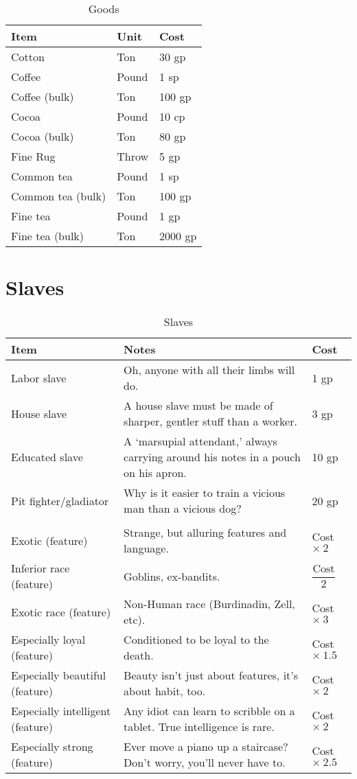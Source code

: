 \documentclass[oneside,11pt,english]{book}
\begin{document}
\begin{table}[hb]
  \centering
  \caption{Goods}
  \label{tab:Goods}
  \begin{tabu} spread 0pt {*{3}{X[-1]}}
    Item &Unit &Cost\\\toprule
    Cotton &Ton &30 gp\\
    Coffee &Pound &1 sp\\
    Coffee (bulk) &Ton &100 gp\\
    Cocoa &Pound &10 cp\\
    Cocoa (bulk) &Ton &80 gp\\
    Fine Rug &Throw &5 gp\\
    Common tea &Pound &1 sp\\
    Common tea (bulk) &Ton &100 gp\\
    Fine tea &Pound &1 gp\\
    Fine tea (bulk) &Ton &2000 gp\\
  \end{tabu}
\end{table}
\clearpage
\section{Slaves}
\begin{table}[hb]
  \centering
  \caption{Slaves}
  \label{tab:Slaves}
  \begin{tabu} spread 0pt {*{3}{X[-1]}}
    Item &Notes &Cost\\\toprule
    Labor slave &Oh, anyone with all their limbs will do. &1 gp\\
    House slave &A house slave must be made of sharper, gentler stuff than a worker. &3 gp\\
    Educated slave &A ‘marsupial attendant,’ always carrying around his notes in a pouch on his apron. &10 gp\\
    Pit fighter/gladiator &Why is it easier to train a vicious man than a vicious dog? &20 gp\\
    \\
    Exotic (feature) &Strange, but alluring features and language. &Cost $\times\ 2 $\\
    Inferior race (feature) &Goblins, ex-bandits. &$ \dfrac{\text{Cost}}{2} $\\
    Exotic race (feature) &Non-Human race (Burdinadin, Zell, etc). &Cost $ \times\ 3$\\
    Especially loyal (feature) &Conditioned to be loyal to the death. &Cost $ \times\ 1.5 $\\
    Especially beautiful (feature) &Beauty isn’t just about features, it’s about habit, too. &Cost $ \times\ 2 $\\
    Especially intelligent (feature) &Any idiot can learn to scribble on a tablet. True intelligence is rare. &Cost $ \times\ 2 $\\
    Especially strong (feature) &Ever move a piano up a staircase? Don’t worry, you’ll never have to. &Cost $ \times\ 2.5 $\\
  \end{tabu}
\end{table}
\end{document}
